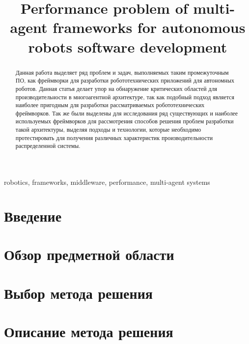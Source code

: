 \documentclass[conference]{IEEEtran}
\begin{document}
	\title{Performance problem of multi-agent frameworks for autonomous robots software development}
	\author{
	}

	\maketitle
	\begin{abstract}
		Данная работа выделяет ряд проблем и задач, выполняемых таким промежуточным ПО, как фреймворки для разработки робототехнических приложений для автономных роботов. Данная статья делает упор на обнаружение критических областей для производительности в многоагентной архитектуре, так как подобный подход является наиболее пригодным для разработки рассматриваемых робототехнических фреймворков. Так же были выделены для исследования ряд существующих и наиболее используемых  фреймворков для рассмотрения способов решения проблем разработки такой архитектуры, выделяя подходы и технологии, которые необходимо протестировать для получения различных характеристик производительности распределенной системы.
	\end{abstract}

	\begin{IEEEkeywords}
		robotics, frameworks, middleware, performance, multi-agent systems
	\end{IEEEkeywords}

	\section{Введение}
		
	\section{Обзор предметной области }
		
	\section{Выбор метода решения}
		
	\section{Описание метода решения}
		
\end{document}
